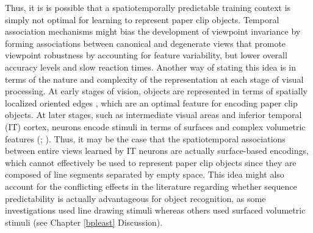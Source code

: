 \documentclass[dwyatte_dissertation.tex]{subfiles}
\begin{document}
Thus, it is is possible that a spatiotemporally predictable training context is simply not optimal for learning to represent paper clip objects. Temporal association mechanisms \cite{StringerPerryRollsEtAl06,WallisBaddeley97,IsikLeiboPoggio12,WallisBulthoff01,WallisBackusLangerEtAl09} might bias the development of viewpoint invariance by forming  associations between canonical and degenerate views that promote viewpoint robustness by accounting for feature variability, but lower overall accuracy levels and slow reaction times. Another way of stating this idea is in terms of the nature and complexity of the representation at each stage of visual processing. At early stages of vision, objects are represented in terms of spatially localized oriented edges \cite{HubelWiesel62}, which are an optimal feature for encoding paper clip objects. At later stages, such as intermediate visual areas and inferior temporal (IT) cortex, neurons encode stimuli in terms of surfaces and complex volumetric features (; ). Thus, it may be the case that the spatiotemporal associations between entire views learned by IT neurons \cite{SakaiMiyashita91,MeyerOlson11,CoxMeierOerteltEtAl05,LiDiCarlo08,LiDiCarlo10,LiDiCarlo12} are actually surface-based encodings, which cannot effectively be used to represent paper clip objects since they are composed of line segments separated by empty space. This idea might also account for the conflicting effects in the literature regarding whether sequence predictability is actually advantageous for object recognition, as some investigations used line drawing stimuli \cite{LawsonHumphreysWatson94} whereas others used surfaced volumetric stimuli \cite{HarmanHumphrey99} (see Chapter \ref{bpleast} Discussion).
\end{document}
